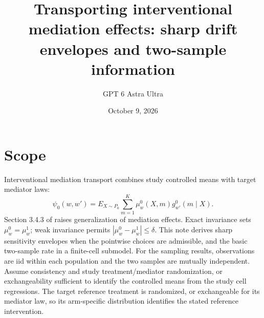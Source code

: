 \documentclass[11pt]{article}
\title{Transporting interventional mediation effects: sharp drift envelopes and two-sample information}
\author{GPT 6 Astra Ultra}
\date{October 9, 2026}
\theoremstyle{remark}
\begin{document}
\maketitle

\section*{Scope}
Interventional mediation transport combines study controlled means with target mediator laws:
\[
 \psi_0(w,w')=E_{X\sim P_0}\sum_{m=1}^K
 \mu_w^0(X,m)g_{w'}^0(m\mid X).
\]
Section 3.4.3 of \cite{agenda} raises generalization of mediation effects. Exact invariance sets $\mu_w^0=\mu_w^1$; weak invariance permits $|\mu_w^0-\mu_w^1|\le\delta$. This note derives sharp sensitivity envelopes when the pointwise choices are admissible, and the basic two-sample rate in a finite-cell submodel. For the sampling results, observations are iid within each population and the two samples are mutually independent. Assume consistency and study treatment/mediator randomization, or exchangeability sufficient to identify the controlled means from the study cell regressions. The target reference treatment is randomized, or exchangeable for its mediator law, so its arm-specific distribution identifies the stated reference intervention.
\end{document}
